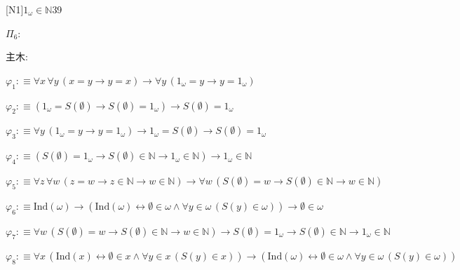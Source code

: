 \begin{fullproof}{[N1]}{$1_{\omega} \in \mathbb{N}$}{39}
\begin{ptree}
\end{ptree}
\noindent$\Pi_{6}$:
\begin{ptree}
\noLine
{}
\noLine
{}
\end{ptree}
\noindent 主木:
\begin{ptree}
\noLine
{}
\end{ptree}
\begin{abbrevlist}
\item $\varphi_{1} :\equiv \forall x\,\forall y\,(x = y \to y = x) \to \forall y\,(1_{\omega} = y \to y = 1_{\omega})$
\item $\varphi_{2} :\equiv (1_{\omega} = S(\emptyset) \to S(\emptyset) = 1_{\omega}) \to S(\emptyset) = 1_{\omega}$
\item $\varphi_{3} :\equiv \forall y\,(1_{\omega} = y \to y = 1_{\omega}) \to 1_{\omega} = S(\emptyset) \to S(\emptyset) = 1_{\omega}$
\item $\varphi_{4} :\equiv (S(\emptyset) = 1_{\omega} \to S(\emptyset) \in \mathbb{N} \to 1_{\omega} \in \mathbb{N}) \to 1_{\omega} \in \mathbb{N}$
\item $\varphi_{5} :\equiv \forall z\,\forall w\,(z = w \to z \in \mathbb{N} \to w \in \mathbb{N}) \to \forall w\,(S(\emptyset) = w \to S(\emptyset) \in \mathbb{N} \to w \in \mathbb{N})$
\item $\varphi_{6} :\equiv \mathrm{Ind}(\omega) \to (\mathrm{Ind}(\omega) \leftrightarrow \emptyset \in \omega \land \forall y \in \omega\,(S(y) \in \omega)) \to \emptyset \in \omega$
\item $\varphi_{7} :\equiv \forall w\,(S(\emptyset) = w \to S(\emptyset) \in \mathbb{N} \to w \in \mathbb{N}) \to S(\emptyset) = 1_{\omega} \to S(\emptyset) \in \mathbb{N} \to 1_{\omega} \in \mathbb{N}$
\item $\varphi_{8} :\equiv \forall x\,(\mathrm{Ind}(x) \leftrightarrow \emptyset \in x \land \forall y \in x\,(S(y) \in x)) \to (\mathrm{Ind}(\omega) \leftrightarrow \emptyset \in \omega \land \forall y \in \omega\,(S(y) \in \omega))$
\end{abbrevlist}
\end{fullproof}
